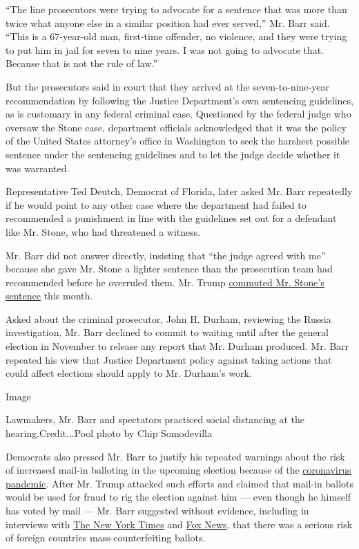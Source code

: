 ``The line prosecutors were trying to advocate for a sentence that was
more than twice what anyone else in a similar position had ever
served,'' Mr. Barr said. ``This is a 67-year-old man, first-time
offender, no violence, and they were trying to put him in jail for seven
to nine years. I was not going to advocate that. Because that is not the
rule of law.''

But the prosecutors said in court that they arrived at the
seven-to-nine-year recommendation by following the Justice Department's
own sentencing guidelines, as is customary in any federal criminal case.
Questioned by the federal judge who oversaw the Stone case, department
officials acknowledged that it was the policy of the United States
attorney's office in Washington to seek the harshest possible sentence
under the sentencing guidelines and to let the judge decide whether it
was warranted.

Representative Ted Deutch, Democrat of Florida, later asked Mr. Barr
repeatedly if he would point to any other case where the department had
failed to recommended a punishment in line with the guidelines set out
for a defendant like Mr. Stone, who had threatened a witness.

Mr. Barr did not answer directly, insisting that ``the judge agreed with
me'' because she gave Mr. Stone a lighter sentence than the prosecution
team had recommended before he overruled them. Mr. Trump
\href{https://www.nytimes.com/2020/07/10/us/politics/trump-roger-stone-clemency.html}{commuted
Mr. Stone's sentence} this month.

Asked about the criminal prosecutor, John H. Durham, reviewing the
Russia investigation, Mr. Barr declined to commit to waiting until after
the general election in November to release any report that Mr. Durham
produced. Mr. Barr repeated his view that Justice Department policy
against taking actions that could affect elections should apply to Mr.
Durham's work.

Image

Lawmakers, Mr. Barr and spectators practiced social distancing at the
hearing.Credit...Pool photo by Chip Somodevilla

Democrats also pressed Mr. Barr to justify his repeated warnings about
the risk of increased mail-in balloting in the upcoming election because
of the
\href{https://www.nytimes.com/interactive/2020/us/coronavirus-us-cases.html}{coronavirus
pandemic}. After Mr. Trump attacked such efforts and claimed that
mail-in ballots would be used for fraud to rig the election against him
--- even though he himself has voted by mail --- Mr. Barr suggested
without evidence, including in interviews with
\href{https://urldefense.proofpoint.com/v2/url?u=https-3A__www.nytimes.com_2020_06_01_magazine_william-2Dbarr-2Dattorney-2Dgeneral.html\&d=DwMFaQ\&c=jGUuvAdBXp_VqQ6t0yah2g\&r=bVVNPs8-wzWySU1LPjQH-giyvd3jgwNM5mI4gec0ZVgkgSksNhhps0rPEeN63Yaq\&m=Wj_rdThk_pA73T0byJFaMQwQ5zUDujOvP2xsA8g0eD0\&s=QDYgELfVpfZGzQjB_QxaqbPpm_pO8hwJpUsg1kpaEgg\&e=}{The
New York Times} and
\href{https://www.foxnews.com/transcript/exclusive-maria-bartiromo-interviews-ag-barr-on-police-reform-big-tech-censorship-durham-investigation}{Fox
News}, that there was a serious risk of foreign countries
mass-counterfeiting ballots.

